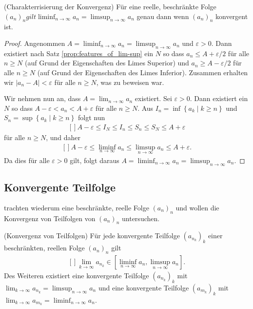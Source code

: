 \documentclass[../Analysis1_script.tex]{subfiles}
\begin{document}
\begin{corollary}{(Charakterrisierung der Konvergenz)}\label{cor:charkonvergenz}
	Für eine reelle, beschränkte Folge $(a_n)_n gilt \liminf _{n\to \infty }a_n=\limsup _{n\to \infty }a_n$ genau dann wenn $(a_n)_n$ konvergent ist. 
\end{corollary}

\begin{proof}
	Angenommen $A=\liminf _{n\to \infty }a_n=\limsup _{n\to \infty }a_n$ und $\varepsilon >0$. Dann existiert nach Satz \ref{prop:features_of_lim-sup} ein $N$ so dass $a_n\leq A+\varepsilon /2$ für alle $n\geq N$ (auf Grund der Eigenschaften des Limes Superior) und $a_n\geq A-\varepsilon /2$ für alle $n\geq N$ (auf Grund der Eigenschaften des Limes Inferior). Zusammen erhalten wir $|a_n-A|<\varepsilon$ für alle $n\geq N$, was zu beweisen war.
	
	Wir nehmen nun an, dass $A=\lim _{n\to \infty }a_n$ existiert. Sei $\varepsilon >0$. Dann existiert ein $N$ so dass $A-\varepsilon <a_n<A+\varepsilon$ für alle $n\geq N$. Aus $I_n=\inf \left \lbrace {a_k} \mid {k\geq n}\right \rbrace$ und $S_n=\sup \left \lbrace {a_k} \mid {k\geq n}\right \rbrace$ folgt nun
	\[\begin{aligned}[]
		A-\varepsilon \leq I_N\leq I_n\leq S_n\leq S_N\leq A+\varepsilon
	\end{aligned}\]
	für alle $n\geq N$, und daher
	\[\begin{aligned}[]
		A-\varepsilon \leq \liminf _{n\to \infty }a_n\leq \limsup _{n\to \infty }a_n \leq A+\varepsilon .
	\end{aligned}\]
	Da dies für alle $\varepsilon >0$ gilt, folgt daraus $A=\liminf _{n\to \infty }a_n=\limsup _{n\to \infty }a_n$. 
\end{proof}

\subsection{Konvergente Teilfolge}

trachten wiederum eine beschränkte, reelle Folge $(a_n)_n$ und wollen die Konvergenz von Teilfolgen von $(a_n)_n$ untersuchen.

\begin{proposition}{(Konvergenz von Teilfolgen)}
	Für jede konvergente Teilfolge $(a_{n_k})_k$ einer beschränkten, reellen Folge $(a_n)_n$ gilt
	\[\begin{aligned}[]
		\lim _{k \to \infty }a_{n_k} \in [\liminf _{n \to \infty } a_n, \limsup _{n \to \infty }a_n].
	\end{aligned}\]
	Des Weiteren existiert eine konvergente Teilfolge $(a_{n_k})_k$ mit $\lim _{k \to \infty }a_{n_k} = \limsup _{n \to \infty }a_n$ und eine konvergente Teilfolge $(a_{m_k})_k$ mit $\lim _{k \to \infty }a_{m_k} = \liminf _{n \to \infty }a_n$. 
\end{proposition}
\end{document}
